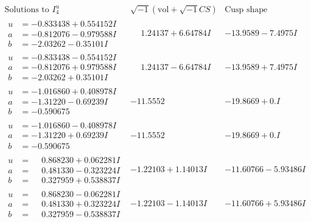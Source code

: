 \documentclass[1p]{elsarticle_modified}
\theoremstyle{definition}
\newcommand{\I}{\sqrt{-1}}
\begin{document}
$$\begin{array}{c|c|c}  
\text{Solutions to }I^u_{4}& \I (\text{vol} + \sqrt{-1}CS) & \text{Cusp shape}\\
 \hline 
\begin{aligned}
u &= -0.833438 + 0.554152 I \\
a &= -0.812076 - 0.979588 I \\
b &= -2.03262 - 0.35101 I\end{aligned}
 & \phantom{-}1.24137 + 6.64784 I & -13.9589 - 7.4975 I \\ \hline\begin{aligned}
u &= -0.833438 - 0.554152 I \\
a &= -0.812076 + 0.979588 I \\
b &= -2.03262 + 0.35101 I\end{aligned}
 & \phantom{-}1.24137 - 6.64784 I & -13.9589 + 7.4975 I \\ \hline\begin{aligned}
u &= -1.016860 + 0.408978 I \\
a &= -1.31220 - 0.69239 I \\
b &= -0.590675\phantom{ +0.000000I}\end{aligned}
 & -11.5552\phantom{ +0.000000I} & -19.8669 + 0. I\phantom{ +0.000000I} \\ \hline\begin{aligned}
u &= -1.016860 - 0.408978 I \\
a &= -1.31220 + 0.69239 I \\
b &= -0.590675\phantom{ +0.000000I}\end{aligned}
 & -11.5552\phantom{ +0.000000I} & -19.8669 + 0. I\phantom{ +0.000000I} \\ \hline\begin{aligned}
u &= \phantom{-}0.868230 + 0.062281 I \\
a &= \phantom{-}0.481330 - 0.323224 I \\
b &= \phantom{-}0.327959 + 0.538837 I\end{aligned}
 & -1.22103 + 1.14013 I & -11.60766 - 5.93486 I \\ \hline\begin{aligned}
u &= \phantom{-}0.868230 - 0.062281 I \\
a &= \phantom{-}0.481330 + 0.323224 I \\
b &= \phantom{-}0.327959 - 0.538837 I\end{aligned}
 & -1.22103 - 1.14013 I & -11.60766 + 5.93486 I \\ \hline\begin{aligned}

\end{aligned}
\end{array}$$
\end{document}

